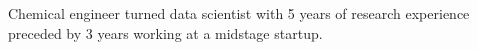 

\begin{cvparagraph}


Chemical engineer turned data scientist with 5 years of research experience preceded by 3 years working at a midstage startup.

\end{cvparagraph}
